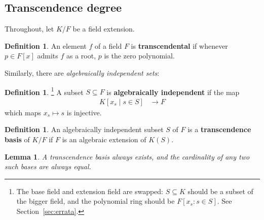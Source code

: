 \documentclass[12pt]{article}
\theoremstyle{plain}
\newtheorem{lemma}[thm]{Lemma}
\theoremstyle{definition}
\newtheorem{defn}[thm]{Definition} %
\begin{document}
\subsection{Transcendence degree}
\label{transcendence}
Throughout, let $K/F$ be a field extension.
\begin{defn}
An element $f$ of a field $F$ is \textbf{transcendental} if whenever $p \in F[x]$ admits $f$ as a root, $p$ is the zero polynomial.
\end{defn}
Similarly, there are \emph{algebraically independent sets}:
\begin{defn}\label{def:algebraic_independence}\footnote{The base field and extension field are swapped: $S\subseteq K$ should be a subset of the bigger field, and the polynomial ring should be $F[x_s : s\in S]$. See Section~\ref{sec:errata}.}
A subset $S \subseteq F$ is \textbf{algebraically independent} if the map
\begin{align*}
    K[x_s\mid s\in S] &\to F
\end{align*}
which maps $x_s \mapsto s$ is injective.
\end{defn}
\begin{defn}
An algebraically independent subset $S$ of $F$ is a \textbf{transcendence basis} of $K/F$ if $F$ is an algebraic extension of $K(S)$.
\end{defn}
\begin{lemma}
A transcendence basis always exists, and the cardinality of any two such bases are always equal.
\end{lemma}
\end{document}

